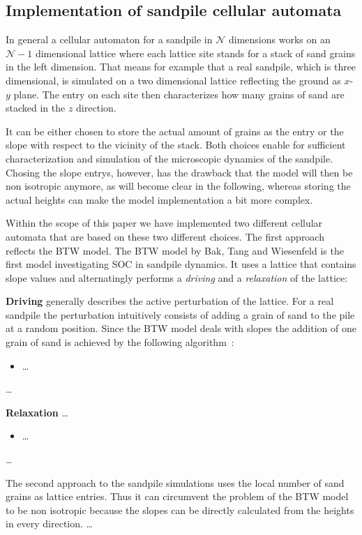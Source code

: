 \subsection{Implementation of sandpile cellular automata}
\label{sec:sandpileImplementation}
In general a cellular automaton for a sandpile in $\mathcal{N}$ dimensions works on an $\mathcal{N}-1$ dimensional
lattice where each lattice site stands for a stack of sand grains in the left dimension. That means for example that
a real sandpile, which is three dimensional, is simulated on a two dimensional lattice reflecting the ground as $x$-$y$
plane. The entry on each site then characterizes how many grains of sand are stacked in the $z$ direction.

It can be either chosen to store the actual amount of grains as the entry or the slope with respect to the vicinity
of the stack. Both choices enable for sufficient characterization and simulation of the microscopic dynamics of the
sandpile. Chosing the slope entrys, however, has the drawback that the model will then be non isotropic anymore, as will
become clear in the following, whereas storing the actual heights can make the model implementation a bit more complex.

Within the scope of this paper we have implemented two different cellular automata that are based on these two different
choices. The first approach reflects the BTW model.
The BTW model by Bak, Tang and Wiesenfeld is the first model investigating SOC in sandpile dynamics. It uses a lattice
that contains slope values and alternatingly performs a \emph{driving} and a \emph{relaxation} of the lattice:

\textbf{Driving} generally describes the active perturbation of the lattice. For a real sandpile the perturbation
intuitively consists of adding a grain of sand to the pile at a random position. Since the BTW model deals with 
slopes the addition of one grain of sand is achieved by the following algorithm~\cite{BakTangWiesenfeld}:
\begin{itemize}
\item \dots%
\end{itemize}
\dots%

\textbf{Relaxation}
\dots
\begin{itemize}
\item \dots%
\end{itemize}
\dots%

The second approach to the sandpile simulations uses the local number of sand grains as lattice entries. Thus it can
circumvent the problem of the BTW model to be non isotropic because the slopes can be directly calculated from the
heights in every direction.
\dots%

